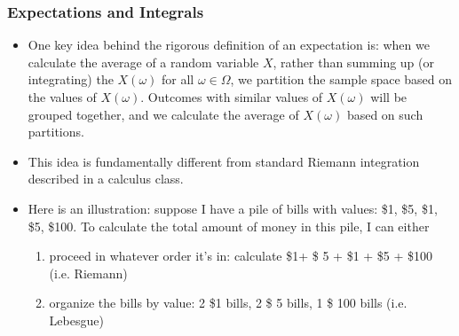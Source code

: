 \documentclass[handout]{beamer}
\begin{document}
\frame
{
  \frametitle{Expectations and Integrals}

   \begin{itemize}

\item<1-> One key idea behind the rigorous definition of an expectation is:  when we calculate the average of a random variable $X$, rather than summing up (or integrating) the $X(\omega)$ for all $\omega\in \Omega$, we partition the sample space based on the values of $X(\omega)$. Outcomes with similar values of $X(\omega)$ will be grouped together, and we calculate the average of $X(\omega)$ based on such partitions. 

\item<2-> This idea is fundamentally different from standard Riemann integration described in a calculus class. 
                         
\item<3-> Here is an illustration: suppose I have a pile of bills with values: \$1, \$5, \$1, \$5, \$100. To calculate the total amount of money in this pile, I can either 
\begin{enumerate}
\item proceed in whatever order it's in:  calculate \$1+ \$ 5 + \$1 + \$5 + \$100 (i.e. Riemann)
\item organize the bills by value: 2  \$1 bills, 2 \$ 5 bills, 1 \$ 100 bills (i.e. Lebesgue)
\end{enumerate}

\end{itemize}
}
\end{document}
